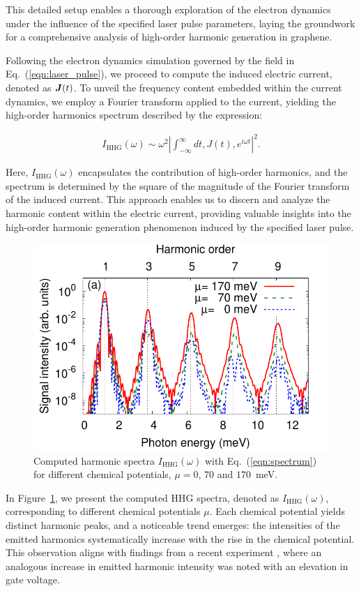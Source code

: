 This detailed setup enables a thorough exploration of the electron dynamics under the influence of the specified laser pulse parameters, laying the groundwork for a comprehensive analysis of high-order harmonic generation in graphene.

Following the electron dynamics simulation governed by the field in Eq.~(\ref{eqn:laser_pulse}), we proceed to compute the induced electric current, denoted as $\boldsymbol J(t)$. To unveil the frequency content embedded within the current dynamics, we employ a Fourier transform applied to the current, yielding the high-order harmonics spectrum described by the expression:

\begin{align}
I_{\mathrm{HHG}}(\omega)\sim \omega^2 \left | \int^{\infty}_{-\infty} dt , J(t) , e^{i\omega t} \right |^2.
\label{eqn:spectrum}
\end{align}

Here, $I_{\mathrm{HHG}}(\omega)$ encapsulates the contribution of high-order harmonics, and the spectrum is determined by the square of the magnitude of the Fourier transform of the induced current. This approach enables us to discern and analyze the harmonic content within the electric current, providing valuable insights into the high-order harmonic generation phenomenon induced by the specified laser pulse.

\begin{figure}[htb]
    \centering
\includegraphics[width=0.8\linewidth]{pic/hhg_mu.pdf}
\caption{\label{fig:hhg_mu} 
Computed harmonic spectra $I_{\mathrm{HHG}}(\omega)$ with Eq.~(\ref{eqn:spectrum}) for different
chemical potentials, $\mu = 0$, $70$ and $170$~meV.}
\end{figure}

In Figure~\ref{fig:hhg_mu}, we present the computed HHG spectra, denoted as $I_{\mathrm{HHG}}(\omega)$, corresponding to different chemical potentials $\mu$. Each chemical potential yields distinct harmonic peaks, and a noticeable trend emerges: the intensities of the emitted harmonics systematically increase with the rise in the chemical potential. This observation aligns with findings from a recent experiment \cite{kovalev2021electrical}, where an analogous increase in emitted harmonic intensity was noted with an elevation in gate voltage.

